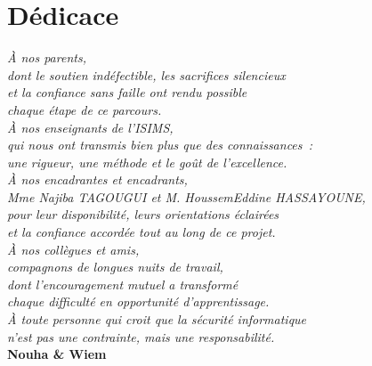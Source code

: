 \chapter*{Dédicace}

\begin{center}
\textit{À nos parents,}\\[0.3em]
\textit{dont le soutien indéfectible, les sacrifices silencieux}\\
\textit{et la confiance sans faille ont rendu possible}\\
\textit{chaque étape de ce parcours.}\\[1em]

\textit{À nos enseignants de l'ISIMS,}\\[0.3em]
\textit{qui nous ont transmis bien plus que des connaissances~:}\\
\textit{une rigueur, une méthode et le goût de l'excellence.}\\[1em]

\textit{À nos encadrantes et encadrants,}\\[0.3em]
\textit{Mme Najiba TAGOUGUI et M. HoussemEddine HASSAYOUNE,}\\
\textit{pour leur disponibilité, leurs orientations éclairées}\\
\textit{et la confiance accordée tout au long de ce projet.}\\[1em]

\textit{À nos collègues et amis,}\\[0.3em]
\textit{compagnons de longues nuits de travail,}\\
\textit{dont l'encouragement mutuel a transformé}\\
\textit{chaque difficulté en opportunité d'apprentissage.}\\[1em]

\textit{À toute personne qui croit que la sécurité informatique}\\
\textit{n'est pas une contrainte, mais une responsabilité.}\\[2em]

\textbf{Nouha \& Wiem}
\end{center}

\clearpage